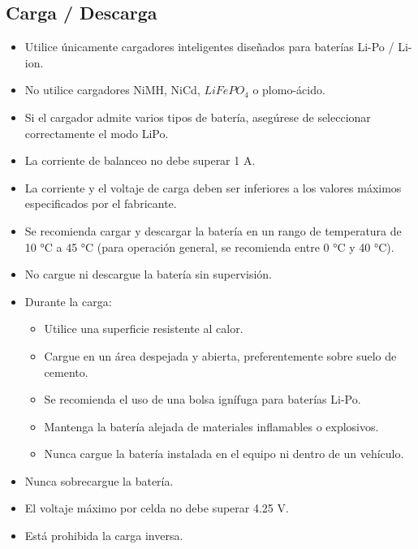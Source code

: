 \documentclass[a4paper,12pt,oneside,pdflatex,italian,final,twocolumn]{article}
\begin{document}
\subsection{Carga / Descarga}
\begin{itemize}
    \item Utilice únicamente cargadores inteligentes diseñados para baterías Li-Po / Li-ion.
    \item No utilice cargadores NiMH, NiCd, $LiFePO_\text{4}$ o plomo-ácido.
    \item Si el cargador admite varios tipos de batería, asegúrese de seleccionar correctamente el modo LiPo.
    \item La corriente de balanceo no debe superar 1 A.
    \item La corriente y el voltaje de carga deben ser inferiores a los valores máximos especificados por el fabricante.
    \item Se recomienda cargar y descargar la batería en un rango de temperatura de 10 °C a 45 °C (para operación general, se recomienda entre 0 °C y 40 °C).
    \item No cargue ni descargue la batería sin supervisión.
    \item Durante la carga:
        \begin{itemize}
            \item Utilice una superficie resistente al calor.
            \item Cargue en un área despejada y abierta, preferentemente sobre suelo de cemento.
            \item Se recomienda el uso de una bolsa ignífuga para baterías Li-Po.
            \item Mantenga la batería alejada de materiales inflamables o explosivos.
            \item Nunca cargue la batería instalada en el equipo ni dentro de un vehículo.
    \end{itemize}
    \item Nunca sobrecargue la batería.
    \item El voltaje máximo por celda no debe superar 4.25 V.
    \item Está prohibida la carga inversa.
\end{itemize}
\end{document}
